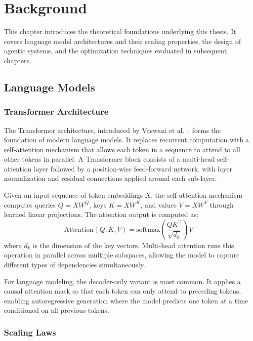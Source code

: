 \chapter{Background} \label{ch:background}

This chapter introduces the theoretical foundations underlying this thesis. It covers language model architectures and their scaling properties, the design of agentic systems, and the optimization techniques evaluated in subsequent chapters.

\section{Language Models}

\subsection{Transformer Architecture}

The Transformer architecture, introduced by Vaswani et al.~\cite{vaswani2017attention}, forms the foundation of modern language models. It replaces recurrent computation with a self-attention mechanism that allows each token in a sequence to attend to all other tokens in parallel. A Transformer block consists of a multi-head self-attention layer followed by a position-wise feed-forward network, with layer normalization and residual connections applied around each sub-layer.

Given an input sequence of token embeddings $X$, the self-attention mechanism computes queries $Q = XW^Q$, keys $K = XW^K$, and values $V = XW^V$ through learned linear projections. The attention output is computed as:
\begin{equation}
\text{Attention}(Q, K, V) = \text{softmax}\!\left(\frac{QK^\top}{\sqrt{d_k}}\right)V
\end{equation}
where $d_k$ is the dimension of the key vectors. Multi-head attention runs this operation in parallel across multiple subspaces, allowing the model to capture different types of dependencies simultaneously.

For language modeling, the decoder-only variant is most common. It applies a causal attention mask so that each token can only attend to preceding tokens, enabling autoregressive generation where the model predicts one token at a time conditioned on all previous tokens.

\subsection{Scaling Laws}

